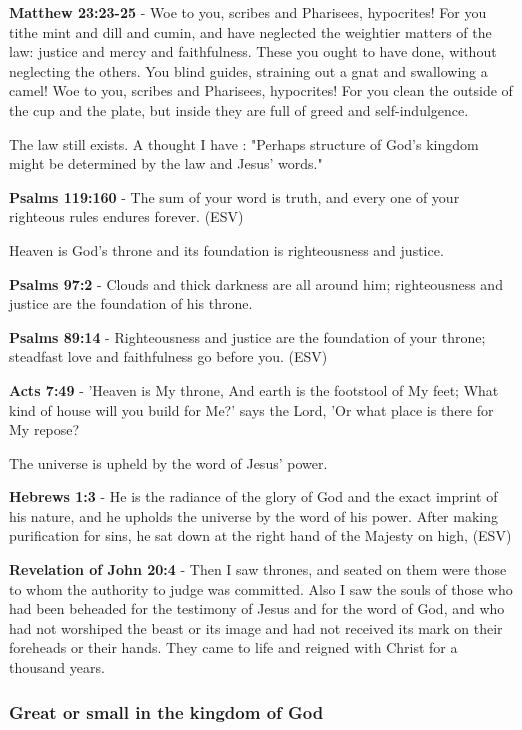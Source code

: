 \documentclass[11pt]{article}
\begin{document}
\textbf{Matthew 23:23-25} - Woe to you, scribes and Pharisees, hypocrites! For you tithe mint and dill and cumin, and have neglected the weightier matters of the law: justice and mercy and faithfulness. These you ought to have done, without neglecting the others.  You blind guides, straining out a gnat and swallowing a camel!  Woe to you, scribes and Pharisees, hypocrites! For you clean the outside of the cup and the plate, but inside they are full of greed and self-indulgence.

The law still exists. A thought I have : "Perhaps structure of God's kingdom might be determined by the law and Jesus' words."

\textbf{Psalms 119:160} - The sum of your word is truth, and every one of your righteous rules endures forever. (ESV)

Heaven is God's throne and its foundation is righteousness and justice.

\textbf{Psalms 97:2} - Clouds and thick darkness are all around him; righteousness and justice are the foundation of his throne.

\textbf{Psalms 89:14} - Righteousness and justice are the foundation of your throne; steadfast love and faithfulness go before you. (ESV)

\textbf{Acts 7:49} - 'Heaven is My throne, And earth is the footstool of My feet; What kind of house will you build for Me?' says the Lord, 'Or what place is there for My repose?

The universe is upheld by the word of Jesus' power.

\textbf{Hebrews 1:3} - He is the radiance of the glory of God and the exact imprint of his nature, and he upholds the universe by the word of his power. After making purification for sins, he sat down at the right hand of the Majesty on high, (ESV)

\textbf{Revelation of John 20:4} - Then I saw thrones, and seated on them were those to whom the authority to judge was committed. Also I saw the souls of those who had been beheaded for the testimony of Jesus and for the word of God, and who had not worshiped the beast or its image and had not received its mark on their foreheads or their hands. They came to life and reigned with Christ for a thousand years.

\subsubsection{Great or small in the kingdom of God}
\label{sec:org45be217}
\end{document}
